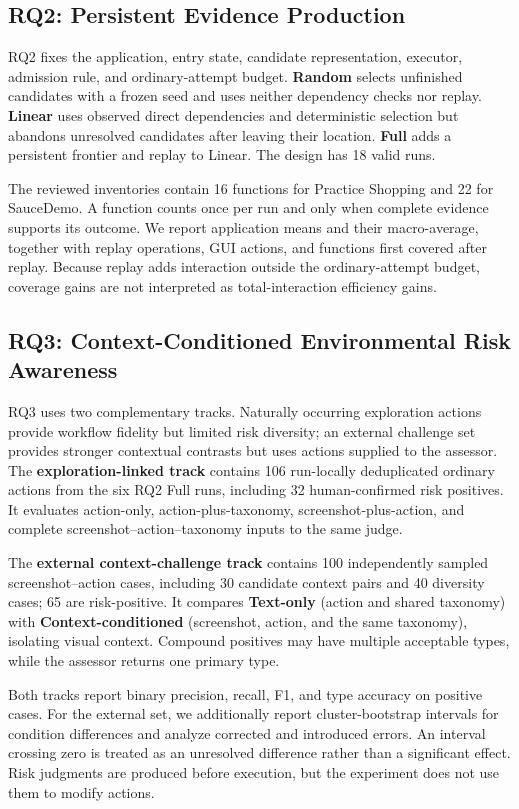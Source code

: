 \subsection{RQ2: Persistent Evidence Production}

RQ2 fixes the application, entry state, candidate representation, executor,
admission rule, and ordinary-attempt budget. \textbf{Random} selects unfinished
candidates with a frozen seed and uses neither dependency checks nor replay.
\textbf{Linear} uses observed direct dependencies and deterministic selection
but abandons unresolved candidates after leaving their location.
\textbf{Full} adds a persistent frontier and replay to Linear. The design has
18 valid runs.

The reviewed inventories contain 16 functions for Practice Shopping and 22 for
SauceDemo. A function counts once per run and only when complete evidence
supports its outcome. We report application means and their macro-average,
together with replay operations, GUI actions, and functions first covered after
replay. Because replay adds interaction outside the ordinary-attempt budget,
coverage gains are not interpreted as total-interaction efficiency gains.

\subsection{RQ3: Context-Conditioned Environmental Risk Awareness}

RQ3 uses two complementary tracks. Naturally occurring exploration actions
provide workflow fidelity but limited risk diversity; an external challenge set
provides stronger contextual contrasts but uses actions supplied to the
assessor. The \textbf{exploration-linked track} contains 106 run-locally
deduplicated ordinary actions from the six RQ2 Full runs, including 32
human-confirmed risk positives. It evaluates action-only, action-plus-taxonomy,
screenshot-plus-action, and complete screenshot--action--taxonomy inputs to the
same judge.

The \textbf{external context-challenge track} contains 100 independently
sampled screenshot--action cases, including 30 candidate context pairs and 40
diversity cases; 65 are risk-positive. It compares \textbf{Text-only} (action
and shared taxonomy) with \textbf{Context-conditioned} (screenshot, action, and
the same taxonomy), isolating visual context. Compound positives may have
multiple acceptable types, while the assessor returns one primary type.

Both tracks report binary precision, recall, F1, and type accuracy on positive
cases. For the external set, we additionally report cluster-bootstrap intervals
for condition differences and analyze corrected and introduced errors. An
interval crossing zero is treated as an unresolved difference rather than a
significant effect. Risk judgments are produced before execution, but the
experiment does not use them to modify actions.
